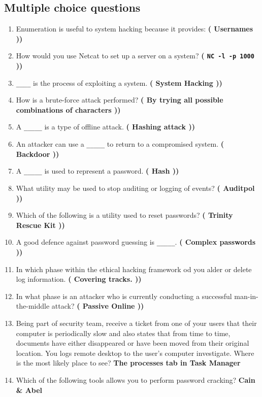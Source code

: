 \subsection{Multiple choice questions}
\begin{enumerate}
    \item Enumeration is useful to system hacking because it provides: \textbf{\left( Usernames \right))}
    \item How would you use Netcat to set up a server on a system? \textbf{\left( \verb|NC -l -p 1000| \right))}
    \item \verb|____| is the process of exploiting a system. \textbf{\left( System Hacking \right))}
    \item How is a brute-force attack performed? \textbf{\left( By trying all possible combinations of characters \right))}
    \item A \verb|_____| is a type of offline attack. \textbf{\left( Hashing attack \right))}
    \item An attacker can use a \verb|_____| to return to a compromised system. \textbf{\left( Backdoor \right))}
    \item A \verb|_____| is used to represent a password. \textbf{\left( Hash \right))}
    \item What utility may be used to stop auditing or logging of events? \textbf{\left( Auditpol \right))}
    \item Which of the following is a utility used to reset passwords? \textbf{\left( Trinity Rescue Kit \right))}
    \item A good defence against password guessing is \verb|_____|. \textbf{\left( Complex passwords \right))}
    \item In which phase within the ethical hacking framework od you alder or delete log information. \textbf{\left( Covering tracks. \right))}
    \item In what phase is an attacker who is currently conducting a successful man-in-the-middle attack? \textbf{\left( Passive Online \right))}
    \item Being part of security team, receive a ticket from one of your users that their computer is periodically slow and also states that from time to time, documents have either disappeared or have been moved from their original location. You logs remote desktop to the user’s computer investigate. Where is the most likely place to see? \textbf{The processes tab in Task Manager}
    \item Which of the following tools allows you to perform password cracking? \textbf{Cain \& Abel}

\end{enumerate}
